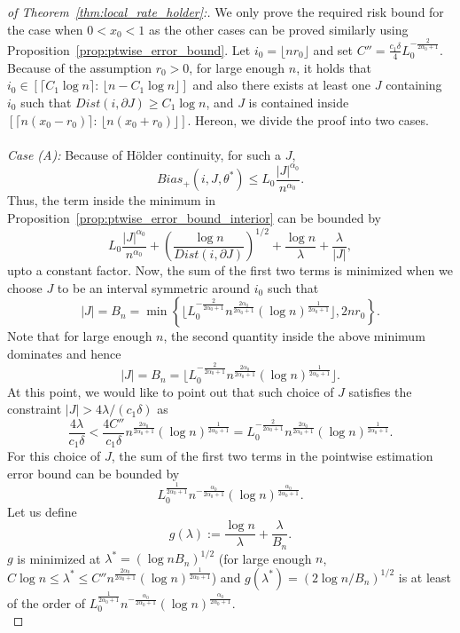 \documentclass[11pt]{article}
\theoremstyle{plain}
\theoremstyle{definition}
\theoremstyle{remark}
\begin{document}
\begin{proof}[of Theorem~\ref{thm:local_rate_holder}:]
    We only prove the required risk bound for the case when $0<x_0<1$ as the other cases can be proved similarly using Proposition~\ref{prop:ptwise_error_bound}.  Let $i_0=\lfloor n r_0 \rfloor$ and set $C''=\frac{c_1\delta }{4}L_0^{-\frac{2}{2\alpha_0+1}}$. Because of the assumption $r_0>0$, for large enough $n$, it holds that $i_0\in [\lceil C_1\log n\rceil:\, \lfloor n-C_1\log n\rfloor]$ and also there exists at least one $J$ containing $i_0$ such that $Dist(i,\partial J)\geq C_1 \log n$, and $J$ is contained inside $\left[\lceil n(x_0-r_0)\rceil:\,\lfloor n(x_0+r_0)\rfloor\right].$ 
    Hereon, we divide the proof into two cases.\\
    \\
    \noindent \textit{Case (A):} Because of H\"{o}lder continuity, for such a $J$,
    \[Bias_+(i,J,\theta^*)\leq L_0 \frac{|J|^{\alpha_0}}{n^{\alpha_0}}.\]
    Thus, the term inside the minimum in Proposition~\ref{prop:ptwise_error_bound_interior} can be bounded by
    \[L_0 \frac{|J|^{\alpha_0}}{n^{\alpha_0}}+\left(\frac{\log n}{Dist(i,\partial J)}\right)^{1/2}+\frac{\log n}{\lambda}+\frac{\lambda}{|J|},\]
    upto a constant factor. Now, the sum of the first two terms is minimized when we choose $J$ to be an interval symmetric around $i_0$ such that 
    \[|J|=B_n=\min \left\{
     \lfloor L_0^{-\frac{2}{2\alpha_0+1}}n^{\frac{2\alpha_0}{2\alpha_0+1}}(\log n)^{\frac{1}{2\alpha_0+1}}\rfloor , 2nr_0\right\}.\]
     Note that for large enough $n$, the second quantity inside the above minimum dominates and hence
     \[|J|=B_n=\lfloor L_0^{-\frac{2}{2\alpha_0+1}}n^{\frac{2\alpha_0}{2\alpha_0+1}}(\log n)^{\frac{1}{2\alpha_0+1}}\rfloor.\]
    At this point, we would like to point out that such choice of $J$ satisfies the constraint $|J|>4\lambda/(c_1 \delta)$ as 
    \[\frac{4\lambda}{c_1 \delta}<\frac{4C''}{c_1\delta} n^{\frac{2\alpha_0}{2\alpha_0+1}}(\log n)^{\frac{1}{2\alpha_0+1}}=L_0^{-\frac{2}{2\alpha_0+1}}n^{\frac{2\alpha_0}{2\alpha_0+1}}(\log n)^{\frac{1}{2\alpha_0+1}}.\]
    For this choice of $J$, the sum of the first two terms in the pointwise estimation error bound can be bounded by
    \[L_0^{\frac{1}{2\alpha_0+1}} n^{-\frac{\alpha_0}{2\alpha_0+1}} (\log n)^{\frac{\alpha_0}{2\alpha_0+1}}.\]
    Let us define
    \[g(\lambda):=\frac{\log n}{\lambda}+\frac{\lambda}{B_n}.\]
    $g$ is minimized at $\lambda^*=(\log n B_n)^{1/2}$ (for large enough $n$, $C \log n\leq \lambda^*\leq C'' n^{\frac{2\alpha_0}{2\alpha_0+1}}(\log n)^{\frac{1}{2\alpha_0+1}}$) and $g(\lambda^*)=(2\log n/B_n)^{1/2}$ is at least of the order of \(L_0^{\frac{1}{2\alpha_0+1}} n^{-\frac{\alpha_0}{2\alpha_0+1}} (\log n)^{\frac{\alpha_0}{2\alpha_0+1}}.\)\\

\end{proof}
\end{document}

